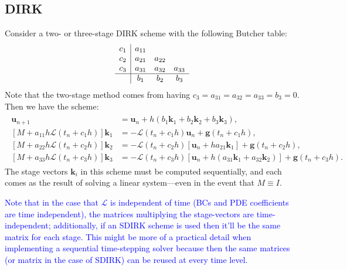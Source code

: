 \documentclass[a4paper,12pt]{article}
\newcommand{\tcb}{\textcolor{blue}}
\begin{document}
\subsection{DIRK}
Consider a two- or three-stage DIRK scheme with the following Butcher table:
\begin{align}
\begin{array}
{c|ccc}
c_1 & a_{11} \\
c_2 & a_{21} & a_{22} \\
c_3 & a_{31} & a_{32} & a_{33} \\
\hline
&b_1 & b_2 & b_3
\end{array}
\end{align}
Note that the two-stage method comes from having $c_3 = a_{31} = a_{32} = a_{33} = b_{3} = 0$.
Then we have the scheme:
\begin{align}
\begin{split}
\mathbf{u}_{n+1} &= \mathbf{u}_{n} + h(b_1 \mathbf{k}_1 + b_2 \mathbf{k}_2 + b_3 \mathbf{k}_3), \\
[M + a_{11} h \mathcal{L}(t_n + c_1 h) ] \mathbf{k}_1 &= -\mathcal{L}(t_n + c_1 h) \mathbf{u}_n + \mathbf{g}(t_n + c_1 h), \\
[M + a_{22} h \mathcal{L}(t_n + c_2 h) ] \mathbf{k}_2 &= -\mathcal{L}(t_n + c_2 h)[ \mathbf{u}_n + h a_{21} \mathbf{k}_1] + \mathbf{g}(t_n + c_2 h), \\
[M + a_{33} h \mathcal{L}(t_n + c_3 h) ] \mathbf{k}_3 &= -\mathcal{L}(t_n + c_3 h)[ \mathbf{u}_n + h(a_{31} \mathbf{k}_1 +  a_{32} \mathbf{k}_2)] + \mathbf{g}(t_n + c_3 h).
\end{split}
\end{align}
The stage vectors $\mathbf{k}_i$ in this scheme must be computed sequentially, and each comes as the result of solving a linear system---even in the event that $M \equiv I$.
 
\tcb{Note that in the case that $\mathcal{L}$ is independent of time (BCs and PDE coefficients are time independent), the matrices multiplying the stage-vectors are time-independent; additionally, if an SDIRK scheme is used then it'll be the same matrix for each stage. This might be more of a practical detail when implementing a sequential time-stepping solver because then the same matrices (or matrix in the case of SDIRK) can be reused at every time level.}


\end{document}
